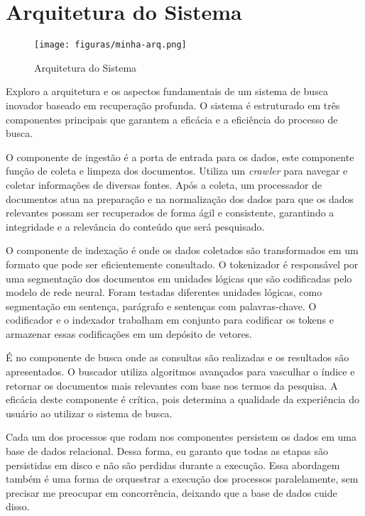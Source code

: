 \documentclass[
	12pt,				%
	openright,			%
	oneside,			%
	a4paper,			%
	english,			%
	french,				%
	spanish,			%
	brazil				%
	]{abntex2}
\begin{document}

\section{Arquitetura do Sistema}\label{sec:arquitetura-do-sistema}

\begin{figure}
    \centering
    \texttt{[image: figuras/minha-arq.png]}
    \caption{Arquitetura do Sistema}
    \label{fig:enter-label}
\end{figure}

Exploro a arquitetura e os aspectos fundamentais de um sistema de busca inovador baseado em recuperação profunda. O sistema é estruturado em três componentes principais que garantem a eficácia e a eficiência do processo de busca.

O componente de ingestão é a porta de entrada para os dados, este componente função de coleta e limpeza dos documentos. Utiliza um \textit{crawler} para navegar e coletar informações de diversas fontes. Após a coleta, um processador de documentos atua na preparação e na normalização dos dados para que os dados relevantes possam ser recuperados de forma ágil e consistente, garantindo a integridade e a relevância do conteúdo que será pesquisado.

O componente de indexação é onde os dados coletados são transformados em um formato que pode ser eficientemente consultado. O tokenizador é responsável por uma segmentação dos documentos em unidades lógicas que são codificadas pelo modelo de rede neural. Foram testadas diferentes unidades lógicas, como segmentação em sentença, parágrafo e sentenças com palavras-chave. O codificador e o indexador trabalham em conjunto para codificar os tokens e armazenar essas codificações em um depósito de vetores.

É no componente de busca onde as consultas são realizadas e os resultados são apresentados. O buscador utiliza algoritmos avançados para vasculhar o índice e retornar os documentos mais relevantes com base nos termos da pesquisa. A eficácia deste componente é crítica, pois determina a qualidade da experiência do usuário ao utilizar o sistema de busca.

Cada um dos processos que rodam nos componentes persistem os dados em uma base de dados relacional. Dessa forma, eu garanto que todas as etapas são persistidas em disco e não são perdidas durante a execução. Essa abordagem também é uma forma de orquestrar a execução dos processos paralelamente, sem precisar me preocupar em concorrência, deixando que a base de dados cuide disso.
\end{document}
